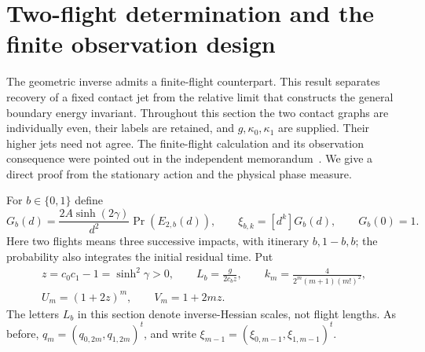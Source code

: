 \section{Two-flight determination and the finite observation design}
\label{sec:v13-two-flight}
The geometric inverse admits a finite-flight counterpart. This result
separates recovery of a fixed contact jet from the relative limit that
constructs the general boundary energy invariant. Throughout this section
the two contact graphs are individually even, their labels are retained,
and $g,\kappa_0,\kappa_1$ are supplied. Their higher jets need not agree.
The finite-flight calculation and its observation consequence were
pointed out in the independent memorandum~\cite{A2ReviewV12}. We give a
direct proof from the stationary action and the physical phase measure.

For $b\in\{0,1\}$ define
\begin{equation}\label{eq:v13-finite-law}
 G_b(d)=\frac{2A\sinh(2\gamma)}{d^2}\Pr(E_{2,b}(d)),\qquad
 \xi_{b,k}=[d^k]G_b(d),\qquad G_b(0)=1.
\end{equation}
Here two flights means three successive impacts, with itinerary
$b,1-b,b$; the probability also integrates the initial residual time.
Put
\begin{equation}\label{eq:v13-constants}
 \begin{gathered}
 z=c_0c_1-1=\sinh^2\gamma>0,\qquad
 L_b=\frac{g}{2c_bz},\qquad
 k_m=\frac{4}{2^m(m+1)(m!)^2},\\
 U_m=(1+2z)^m,\qquad V_m=1+2mz.
 \end{gathered}
\end{equation}
The letters $L_b$ in this section denote inverse-Hessian scales, not
flight lengths. As before, $q_m=(q_{0,2m},q_{1,2m})^t$, and write
$\xi_{m-1}=(\xi_{0,m-1},\xi_{1,m-1})^t$.

